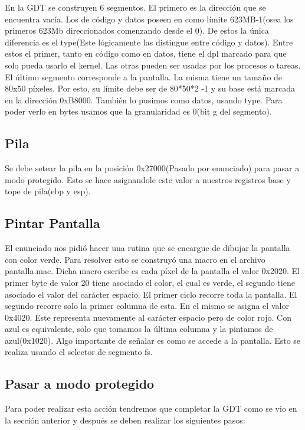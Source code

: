 \documentclass[a4paper]{article}
\begin{document}
En la GDT se construyen 6 segmentos. El primero es la dirección que se encuentra vacía. Los de código y datos poseen en como límite 623MB-1(osea los primeros 623Mb direccionados comenzando desde el 0). De estos la única diferencia es el type(Este lógicamente las distingue entre código y datos). Entre estos el primer, tanto en código como en datos, tiene el dpl marcado para que solo pueda usarlo el kernel. Las otras pueden ser usadas por los procesos o tareas. El último segmento corresponde a la pantalla. La misma tiene un tamaño de 80x50 píxeles. Por esto, su límite debe ser de 80*50*2 -1 y su base está marcada en la dirección 0xB8000. También lo pusimos como datos, usando type. Para poder verlo en bytes usamos que la granularidad es 0(bit g del segmento).

\subsection{Pila}

Se debe setear la pila en la posición 0x27000(Pasado por enunciado) para pasar a modo protegido. Esto se hace asignandole este valor a nuestros registros base y tope de pila(ebp y esp). 

\subsection{Pintar Pantalla}

El enunciado nos pidió hacer una rutina que se encargue de dibujar la pantalla con color verde. Para resolver esto se construyó una macro en el archivo pantalla.mac. Dicha macro escribe es cada píxel de la pantalla el valor 0x2020. El primer byte de valor 20 tiene asociado el color, el cual es verde, el segundo tiene asociado el valor del carácter espacio. El primer ciclo recorre toda la pantalla. El segundo recorre solo la primer columna de esta. En el mismo se asigna el valor 0x4020. Este representa nuevamente al carácter espacio pero de color rojo. Con azul es equivalente, solo que tomamos la última columna y la pintamos de azul(0x1020). Algo importante de señalar es como se accede a la pantalla. Esto se realiza usando el selector de segmento fs.

\subsection{Pasar a modo protegido}

Para poder realizar esta acción tendremos que completar la GDT como se vio en la sección anterior y después se deben realizar los siguientes pasos:
\end{document}
